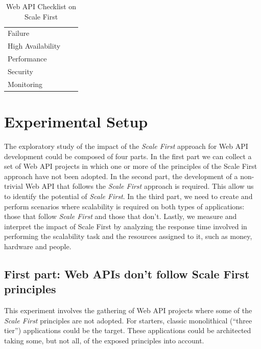 \documentclass[10pt,article]{IEEEtran}
\begin{document}
\begin{table}[h!]
\begin{tabular}{lc|c}
        \hspace{0.2cm}Failure& & \\
        \hspace{0.2cm}High Availability & & \\
        \hspace{0.2cm}Performance & & \\
        \hspace{0.2cm}Security & & \\
        \hspace{0.2cm}Monitoring & &\\                 
    \bottomrule[1.5pt]
    \end{tabular}
    \caption{Web API Checklist on Scale First}\label{table:checklist}    
\end{table}


\ifCLASSOPTIONcompsoc
\else
    \section{Experimental Setup}
\label{sec:experimentals}
\fi

The exploratory study of the impact of the \textit{Scale First} approach for Web API development could be composed of four parts. In the first part we can collect a set of Web API projects in which one or more of the principles of the Scale First approach have not been adopted. In the second part, the development of a non-trivial Web API that follows the \textit{Scale First} approach is required. This allow us to identify the potential of \textit{Scale First}. In the third part, we need to create and perform scenarios where scalability is required on both types of applications: those that follow \textit{Scale First} and those that don't. Lastly, we measure and interpret the impact of Scale First by analyzing the response time involved in performing the scalability task and the resources assigned to it, such as money, hardware and people.


\subsection{First part: Web APIs don't follow Scale First principles}
This experiment involves the gathering of Web API projects where some of the \textit{Scale First} principles are not adopted. For starters, classic monolithical (``three tier'') applications could be the target. These applications could be architected taking some, but not all, of the exposed principles into account. 
\end{document}
